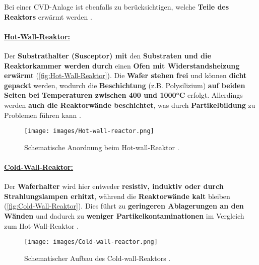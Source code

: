 \documentclass{article} %
\begin{document}
Bei einer CVD-Anlage ist ebenfalls zu berücksichtigen, welche \textbf{Teile des Reaktors} erwärmt werden \cite{keplinger2024CVD}.

\vspace{0.0em}

\paragraph{\uline{Hot-Wall-Reaktor:}} Der \textbf{Substrathalter (Susceptor) mit} den \textbf{Substraten und die Reaktorkammer werden durch} einen \textbf{Ofen mit Widerstandsheizung erwärmt} (\autoref{fig:Hot-Wall-Reaktor}). Die \textbf{Wafer stehen frei} und können \textbf{dicht gepackt} werden, wodurch die \textbf{Beschichtung} (z.B. Polysilizium) \textbf{auf beiden Seiten bei Temperaturen zwischen 400 und 1000°C} erfolgt. Allerdings werden \textbf{auch die Reaktorwände beschichtet}, was durch \textbf{Partikelbildung} zu Problemen führen kann \cite{keplinger2024CVD}.

\begin{figure}[htb!]
    \centering
    \texttt{[image: images/Hot-wall-reactor.png]} %
    \captionsetup{labelfont=bf} %
    \caption{Schematische Anordnung beim Hot-wall-Reaktor \cite{keplinger2024CVD}.}
    \label{fig:Hot-Wall-Reaktor}
\end{figure}

\vspace{0.0em}

\paragraph{\uline{Cold-Wall-Reaktor:}} Der \textbf{Waferhalter} wird hier entweder \textbf{resistiv, induktiv oder durch Strahlungslampen erhitzt}, während die \textbf{Reaktorwände kalt} bleiben (\autoref{fig:Cold-Wall-Reaktor}). Dies führt zu \textbf{geringeren Ablagerungen an den Wänden} und dadurch zu \textbf{weniger Partikelkontaminationen} im Vergleich zum Hot-Wall-Reaktor \cite{keplinger2024CVD}.

\begin{figure}[htb!]
    \centering
    \texttt{[image: images/Cold-wall-reactor.png]} %
    \captionsetup{labelfont=bf} %
    \caption{Schematischer Aufbau des Cold-wall-Reaktors \cite{keplinger2024CVD}.}
    \label{fig:Cold-Wall-Reaktor}
\end{figure}
\end{document}
